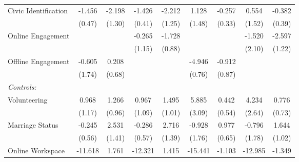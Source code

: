 \begin{table}[htbp]
\begin{tabular}{l*{8}{c}}
\hspace{0.25cm} Civic Identification&-1.456\sym{**} &-2.198         &-1.426\sym{**} &-2.212         &1.128         &-0.257         &0.554         &-0.382         \\
                              &(0.47)         &(1.30)         &(0.41)         &(1.25)         &(1.48)         &(0.33)         &(1.52)         &(0.39)         \\
\hspace{0.25cm} Online Engagement&              &              &-0.265         &-1.728         &              &              &-1.520         &-2.597\sym{*}  \\
                              &              &              &(1.15)         &(0.88)         &              &              &(2.10)         &(1.22)         \\
\hspace{0.25cm} Offline Engagement&-0.605         &0.208         &              &              &-4.946\sym{***}&-0.912         &              &              \\
                              &(1.74)         &(0.68)         &              &              &(0.76)         &(0.87)         &              &              \\
\emph{Controls:}              &              &              &              &              &              &              &              &              \\
\hspace{0.25cm} Volunteering  &0.968         &1.266         &0.967         &1.495         &5.885         &0.442         &4.234         &0.776         \\
                              &(1.17)         &(0.96)         &(1.09)         &(1.01)         &(3.09)         &(0.54)         &(2.64)         &(0.73)         \\
\hspace{0.25cm} Marriage Status&-0.245         &2.531         &-0.286         &2.716         &-0.928         &0.977         &-0.796         &1.644         \\
                              &(0.56)         &(1.41)         &(0.57)         &(1.39)         &(1.76)         &(0.65)         &(1.78)         &(1.02)         \\
\hspace{0.25cm} Online Workspace&-11.618         &1.761         &-12.321\sym{*}  &1.415         &-15.441\sym{**} &-1.103         &-12.985         &-1.349         \\

\end{tabular}
\end{table}
